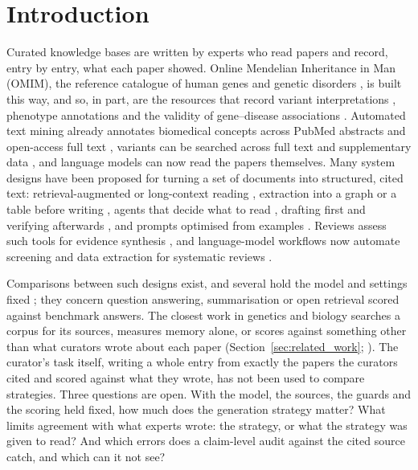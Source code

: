 \documentclass{article} %
\begin{document}
\section{Introduction}
\label{sec:intro}
Curated knowledge bases are written by experts who read papers and record, entry by entry, what each paper showed. Online Mendelian Inheritance in Man (OMIM), the reference catalogue of human genes and genetic disorders \citep{Amberger2014OmimorgOnline,amberger2019omim,hamosh2021online}, is built this way, and so, in part, are the resources that record variant interpretations \citep{Landrum2017ClinvarImproving,landrum2025clinvar}, phenotype annotations \citep{robinson2008human,gargano2024human} and the validity of gene--disease associations \citep{strande2017evaluating}. Automated text mining already annotates biomedical concepts across PubMed abstracts and open-access full text \citep{Wei2019PubtatorCentral,wei2024pubtator}, variants can be searched across full text and supplementary data \citep{allot2023tracking}, and language models can now read the papers themselves. Many system designs have been proposed for turning a set of documents into structured, cited text: retrieval-augmented or long-context reading \citep{Lewis2020RetrievalaugmentedGeneration,li2024retrieval}, extraction into a graph or a table before writing \citep{edge2024local,joshi2026sliders}, agents that decide what to read \citep{Nakano2021WebgptBrowserassisted,Lla2023PaperqaRetrievalaugmented,skarlinski2024language}, drafting first and verifying afterwards \citep{Gao2022RarrResearching,dhuliawala2024chainofverification}, and prompts optimised from examples \citep{Khattab2023DspyCompiling,agrawal2026gepa}. Reviews assess such tools for evidence synthesis \citep{Clark2025GenerativeArtificial,scherbakov2025emergence}, and language-model workflows now automate screening and data extraction for systematic reviews \citep{cao2025automation,wang2025accelerating}.

Comparisons between such designs exist, and several hold the model and settings fixed \citep{li2024retrieval,Li2025LaraBenchmarking,han2025rag}; they concern question answering, summarisation or open retrieval scored against benchmark answers. The closest work in genetics and biology searches a corpus for its sources, measures memory alone, or scores against something other than what curators wrote about each paper (Section~\ref{sec:related_work}; \citealp{zhang2026flyaoc,yan2026genknowrd,skarlinski2024language,groza2026systematic}). The curator's task itself, writing a whole entry from exactly the papers the curators cited and scored against what they wrote, has not been used to compare strategies. Three questions are open. With the model, the sources, the guards and the scoring held fixed, how much does the generation strategy matter? What limits agreement with what experts wrote: the strategy, or what the strategy was given to read? And which errors does a claim-level audit against the cited source catch, and which can it not see?
\end{document}
